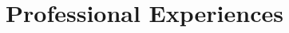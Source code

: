 \documentclass[10pt, letterpaper]{article}
\newenvironment{highlights}{
    \begin{itemize}[
        topsep=0.10 cm,
        parsep=0.10 cm,
        partopsep=0pt,
        itemsep=0pt,
        leftmargin=0.4 cm + 10pt
    ]
}{
    \end{itemize}
} %
\newenvironment{onecolentry}{
    \begin{adjustwidth}{
        0.2 cm + 0.00001 cm
    }{
        0.2 cm + 0.00001 cm
    }
}{
    \end{adjustwidth}
} %
\begin{document}


    \section{Professional Experiences}
\end{document}

